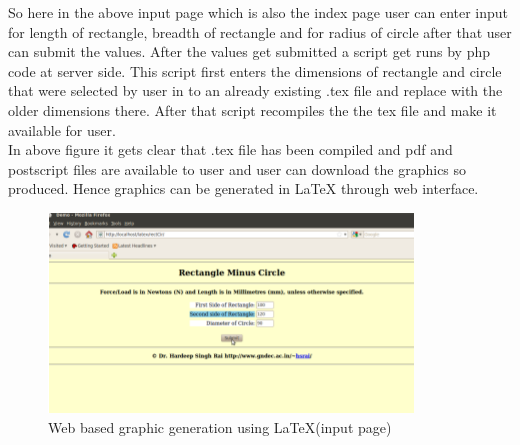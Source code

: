 So here in the above input page which is also the index page user can enter input
for length of rectangle, breadth of rectangle and for radius of circle after that user can submit the values. After the values get submitted a script get runs by php code at server
side. This script first enters the dimensions of rectangle and circle that were selected by
user in to an already existing .tex file and replace with the older dimensions there. After
that script recompiles the the tex file and make it available for user.\\

In above figure it gets clear that .tex file has been compiled and pdf and postscript files
are available to user and user can download the graphics so produced. Hence graphics
can be generated in \LaTeX{} through web interface.
\begin{figure}[ht]
\centering
\includegraphics[scale=1]{images/webgraphic.png}
\caption{Web based graphic generation using \LaTeX{}(input page)}
\end{figure}
